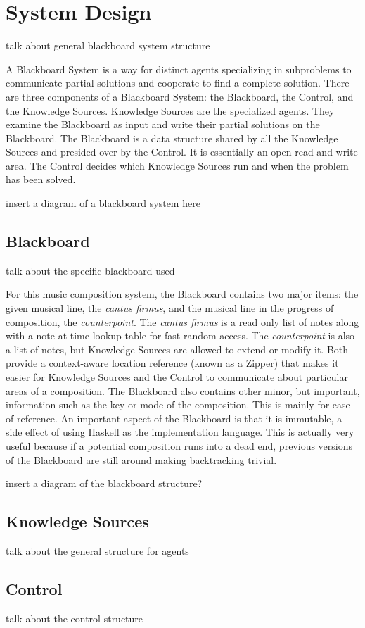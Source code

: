 \section{System Design}

talk about general blackboard system structure

A Blackboard System is a way for distinct agents specializing in subproblems to communicate partial solutions and cooperate to find a complete solution.
There are three components of a Blackboard System: the Blackboard, the Control, and the Knowledge Sources.
Knowledge Sources are the specialized agents. They examine the Blackboard as input and write their partial solutions on the Blackboard.
The Blackboard is a data structure shared by all the Knowledge Sources and presided over by the Control. It is essentially an open read and write area.
The Control decides which Knowledge Sources run and when the problem has been solved.

insert a diagram of a blackboard system here

\subsection{Blackboard}

talk about the specific blackboard used

For this music composition system, the Blackboard contains two major items: the given musical line, the \emph{cantus firmus}, and the musical line in the progress of composition, the \emph{counterpoint}.
The \emph{cantus firmus} is a read only list of notes along with a note-at-time lookup table for fast random access.
The \emph{counterpoint} is also a list of notes, but Knowledge Sources are allowed to extend or modify it.
Both provide a context-aware location reference (known as a Zipper) that makes it easier for Knowledge Sources and the Control to communicate about particular areas of a composition.
The Blackboard also contains other minor, but important, information such as the key or mode of the composition. This is mainly for ease of reference.
An important aspect of the Blackboard is that it is immutable, a side effect of using Haskell as the implementation language.
This is actually very useful because if a potential composition runs into a dead end, previous versions of the Blackboard are still around making backtracking trivial.

insert a diagram of the blackboard structure?

\subsection{Knowledge Sources}

talk about the general structure for agents



\subsection{Control}

talk about the control structure
